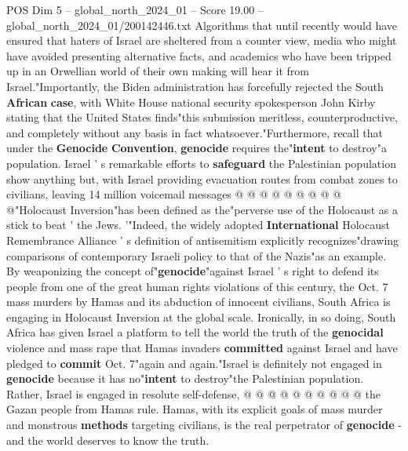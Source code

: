 \begin{textsample}{POS Dim 5 – global\_north\_2024\_01 – Score 19.00 – global\_north\_2024\_01/200142446.txt}
Algorithms that until recently would have ensured that haters of Israel are sheltered from a counter view, media who might have avoided presenting alternative facts, and academics who have been tripped up in an Orwellian world of their own making will hear it from Israel."Importantly, the Biden administration has forcefully rejected the South \textbf{African} \textbf{case}, with White House national security spokesperson John Kirby stating that the United States finds"this submission meritless, counterproductive, and completely without any basis in fact whatsoever."Furthermore, recall that under the \textbf{Genocide} \textbf{Convention}, \textbf{genocide} requires the"\textbf{intent} to destroy"a population.
Israel ' s remarkable efforts to \textbf{safeguard} the Palestinian population show anything but, with Israel providing evacuation routes from combat zones to civilians, leaving 14 million voicemail messages @ @ @ @ @ @ @ @ @ @"Holocaust Inversion"has been defined as the"perverse use of the Holocaust as a stick to beat ' the Jews. '"Indeed, the widely adopted \textbf{International} Holocaust Remembrance Alliance ' s definition of antisemitism explicitly recognizes"drawing comparisons of contemporary Israeli policy to that of the Nazis"as an example.
By weaponizing the concept of"\textbf{genocide}"against Israel ' s right to defend its people from one of the great human rights violations of this century, the Oct. 7 mass murders by Hamas and its abduction of innocent civilians, South Africa is engaging in Holocaust Inversion at the global scale.
Ironically, in so doing, South Africa has given Israel a platform to tell the world the truth of the \textbf{genocidal} violence and mass rape that Hamas invaders \textbf{committed} against Israel and have pledged to \textbf{commit} Oct. 7"again and again."Israel is definitely not engaged in \textbf{genocide} because it has no"\textbf{intent} to destroy"the Palestinian population.
Rather, Israel is engaged in resolute self-defense, @ @ @ @ @ @ @ @ @ @ the Gazan people from Hamas rule.
Hamas, with its explicit goals of mass murder and monstrous \textbf{methods} targeting civilians, is the real perpetrator of \textbf{genocide} - and the world deserves to know the truth.

\end{textsample}
